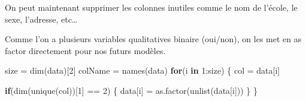 \documentclass[
]{article}
\newenvironment{Shaded}{\begin{snugshade}}{\end{snugshade}}
\newcommand{\CommentTok}[1]{\textcolor[rgb]{0.56,0.35,0.01}{\textit{#1}}}
\newcommand{\ConstantTok}[1]{\textcolor[rgb]{0.00,0.00,0.00}{#1}}
\newcommand{\ControlFlowTok}[1]{\textcolor[rgb]{0.13,0.29,0.53}{\textbf{#1}}}
\newcommand{\DecValTok}[1]{\textcolor[rgb]{0.00,0.00,0.81}{#1}}
\newcommand{\FunctionTok}[1]{\textcolor[rgb]{0.00,0.00,0.00}{#1}}
\newcommand{\NormalTok}[1]{#1}
\newcommand{\OtherTok}[1]{\textcolor[rgb]{0.56,0.35,0.01}{#1}}
\newcommand{\SpecialCharTok}[1]{\textcolor[rgb]{0.00,0.00,0.00}{#1}}
\begin{document}
\begin{Shaded}
\end{Shaded}

On peut maintenant supprimer les colonnes inutiles comme le nom de
l'école, le sexe, l'adresse, etc\ldots{}

\begin{Shaded}
\end{Shaded}

Comme l'on a plusieurs variables qualitatives binaire (oui/non), on les
met en as factor directement pour nos futurs modèles.

\begin{Shaded}
\begin{Highlighting}[]
\NormalTok{size }\OtherTok{=} \FunctionTok{dim}\NormalTok{(data)[}\DecValTok{2}\NormalTok{]}
\NormalTok{colName }\OtherTok{=} \FunctionTok{names}\NormalTok{(data)}
\ControlFlowTok{for}\NormalTok{(i }\ControlFlowTok{in} \DecValTok{1}\SpecialCharTok{:}\NormalTok{size)}
\NormalTok{\{}
\NormalTok{  col }\OtherTok{=}\NormalTok{ data[i]}
  
  \ControlFlowTok{if}\NormalTok{(}\FunctionTok{dim}\NormalTok{(}\FunctionTok{unique}\NormalTok{(col))[}\DecValTok{1}\NormalTok{] }\SpecialCharTok{==} \DecValTok{2}\NormalTok{)}
\NormalTok{  \{}
\NormalTok{    data[i] }\OtherTok{=} \FunctionTok{as.factor}\NormalTok{(}\FunctionTok{unlist}\NormalTok{(data[i]))}
\NormalTok{  \}}
\NormalTok{\}}
\end{Highlighting}
\end{Shaded}
\end{document}
